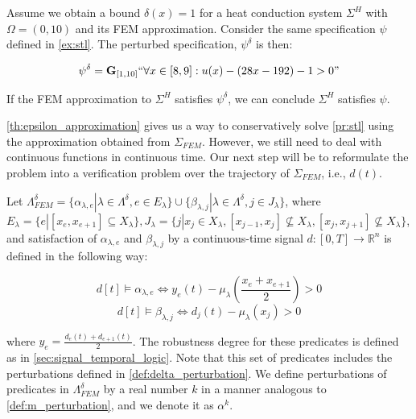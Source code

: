 \documentclass[oribibl]{llncs/llncs}
\newcommand*{\R}{\mathbb{R}}
\newcommand{\Always}{\mathbf{G}}
\begin{document}
\begin{example}
    \label{ex:eps_approx}

    Assume we obtain a bound $\delta(x) = 1$ for a heat conduction system
    $\Sigma^H$ with $\Omega = (0, 10)$ and its
    FEM approximation. Consider the same specification $\psi$ defined in \cref{ex:stl}.
    The perturbed specification, $\psi^\delta$ is then:
    
    \begin{equation}
        \psi^\delta = \Always_{[1,10]} ``\forall x \in [8,9] : u(x) - (28x -
        192) - 1 > 0"
    \end{equation}

    If the FEM approximation to $\Sigma^H$ satisfies $\psi^\delta$, we can
    conclude $\Sigma^H$ satisfies $\psi$.
    
\end{example}

\cref{th:epsilon_approximation} gives us a way to conservatively solve
\cref{pr:stl} using the approximation obtained from $\Sigma_{FEM}$.
However, we still need to deal with continuous functions in continuous time. Our
next step will be to reformulate the problem into a verification problem over
the trajectory of $\Sigma_{FEM}$, i.e., $d(t)$.

Let $\Lambda^{\delta}_{FEM} = \{\alpha_{\lambda, e} | \lambda \in
\Lambda^{\delta}, e \in E_{\lambda}\} \cup \{\beta_{\lambda, j} | \lambda \in
\Lambda^{\delta}, j \in J_{\lambda}\}$, where $E_{\lambda} = \{e | [x_e, x_{e+1}] \subseteq
X_{\lambda}\}, J_{\lambda} = \{j | x_j \in X_\lambda, [x_{j-1}, x_j] \not\subseteq
X_\lambda, [x_{j}, x_{j+1}] \not\subseteq X_\lambda \}$,
and satisfaction of $\alpha_{\lambda, e}$ and $\beta_{\lambda, j}$ by 
a continuous-time signal $d : [0, T] \to \R^n$
is defined in the following way:

\begin{equation}
    d[t] \models \alpha_{\lambda, e} \iff y_e(t) - 
    \mu_\lambda(\frac{x_e + x_{e + 1}}{2}) > 0 
\end{equation}
\begin{equation}
     d[t] \models \beta_{\lambda, j} \iff d_j(t) - \mu_\lambda(x_j) > 0
\end{equation}

where $y_e = \frac{d_e(t) + d_{e+1}(t)}{2}$. The robustness degree for these
predicates is defined as in \cref{sec:signal_temporal_logic}.
Note that this set of predicates includes the perturbations defined in
\cref{def:delta_perturbation}. We define perturbations of predicates in
$\Lambda^{\delta}_{FEM}$ by a real number $k$ in a manner analogous to
\cref{def:m_perturbation}, and we denote it as $\alpha^k$.
\end{document}
